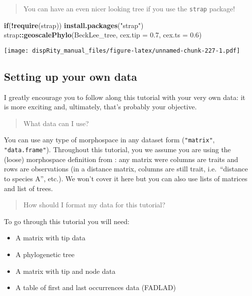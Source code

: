 \documentclass[
]{book}
\newenvironment{Shaded}{\begin{snugshade}}{\end{snugshade}}
\newcommand{\ControlFlowTok}[1]{\textcolor[rgb]{0.13,0.29,0.53}{\textbf{#1}}}
\newcommand{\DataTypeTok}[1]{\textcolor[rgb]{0.13,0.29,0.53}{#1}}
\newcommand{\FloatTok}[1]{\textcolor[rgb]{0.00,0.00,0.81}{#1}}
\newcommand{\KeywordTok}[1]{\textcolor[rgb]{0.13,0.29,0.53}{\textbf{#1}}}
\newcommand{\NormalTok}[1]{#1}
\newcommand{\OperatorTok}[1]{\textcolor[rgb]{0.81,0.36,0.00}{\textbf{#1}}}
\newcommand{\StringTok}[1]{\textcolor[rgb]{0.31,0.60,0.02}{#1}}
\providecommand{\tightlist}{%
  \setlength{\itemsep}{0pt}\setlength{\parskip}{0pt}}
\begin{document}
\begin{quote}
You can have an even nicer looking tree if you use the \texttt{strap} package!
\end{quote}

\begin{Shaded}
\begin{Highlighting}[]
\ControlFlowTok{if}\NormalTok{(}\OperatorTok{!}\KeywordTok{require}\NormalTok{(strap)) }\KeywordTok{install.packages}\NormalTok{(}\StringTok{"strap"}\NormalTok{)}
\NormalTok{strap}\OperatorTok{::}\KeywordTok{geoscalePhylo}\NormalTok{(BeckLee\_tree, }\DataTypeTok{cex.tip =} \FloatTok{0.7}\NormalTok{, }\DataTypeTok{cex.ts =} \FloatTok{0.6}\NormalTok{)}
\end{Highlighting}
\end{Shaded}

\texttt{[image: dispRity\_manual\_files/figure-latex/unnamed-chunk-227-1.pdf]}

\hypertarget{setting-up-your-own-data}{%
\subsection{Setting up your own data}\label{setting-up-your-own-data}}

I greatly encourage you to follow along this tutorial with your very own data: it is more exciting and, ultimately, that's probably your objective.

\begin{quote}
What data can I use?
\end{quote}

You can use any type of morphospace in any dataset form (\texttt{"matrix"}, \texttt{"data.frame"}). Throughout this tutorial, you we assume you are using the (loose) morphospace definition from \citet{Guillerme2020}: any matrix were columns are traits and rows are observations (in a distance matrix, columns are still trait, i.e.~``distance to species A'', etc.).
We won't cover it here but you can also use lists of matrices and list of trees.

\begin{quote}
How should I format my data for this tutorial?
\end{quote}

To go through this tutorial you will need:

\begin{itemize}
\tightlist
\item
  A matrix with tip data
\item
  A phylogenetic tree
\item
  A matrix with tip and node data
\item
  A table of first and last occurrences data (FADLAD)
\end{itemize}
\end{document}
